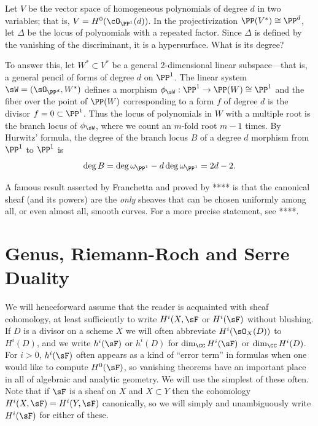 \begin{example}
 Let $V$ be the vector space of homogeneous polynomials of degree $d$ in two variables; that is, $V = H^0(\cO_{\PP^1}(d))$. In the projectivization $\PP(V^{*}) \cong \PP^d$, let $\Delta$ be the locus of polynomials with a repeated factor. Since $\Delta$ is defined by the vanishing of the discriminant, it is a hypersurface. What is its degree?
 
 To answer this, let $W^{*}\subset V^{*}$ be a general 2-dimensional linear subspace---that is, a general pencil of forms of degree $d$ on $\PP^1$. The linear system $\sW = (\sO_{\PP^{d}}, W^{*})$ defines a morphism $\phi_{\sW} : \PP^{1} \to \PP(W) \cong \PP^{1}$ and the fiber over the point of $\PP(W)$ corresponding to a form $f$ of degree $d$ is the divisor $f = 0\subset \PP^{1}$. Thus the locus of polynomials in $W$ with a multiple root is the branch locus of $\phi_{\sW}$, where we count an $m$-fold root $m-1$ times.
 By Hurwitz' formula, the degree of the branch locus $B$ of a degree $d$ morphism from $\PP^{1}$ to $\PP^{1}$ is
 $$
 \deg B = \deg \omega_{\PP^{1}} - d\deg \omega_{\PP^{1}} = 2d-2.
 $$
 \end{example}
 
\begin{fact}
A famous result asserted by Franchetta and proved by **** is that the canonical sheaf (and its powers) are the \emph{only} sheaves that can be chosen uniformly among all, or even almost all, smooth curves. For a more precise statement, see ****.
\end{fact}

\section{Genus, Riemann-Roch and Serre Duality}

We will henceforward assume that the reader is acquainted with sheaf cohomology, at least sufficiently to write
$H^i(X, \sF$ or  $H^i(\sF)$ without blushing. If $D$ is a divisor on a scheme $X$ we will often
abbreviate $H^i(\sO_X(D))$ to $H^i(D)$, and we write $h^i(\sF)$ or $h^{i}(D)$ for $\dim_{\CC}H^i(\sF)$ or $\dim_{\CC}H^i(D)$. For $i>0$, $h^{i}(\sF)$ often appears as a kind of ``error term'' in formulas when one would like to compute
$H^{0}(\sF)$, so vanishing theorems have an important place in all of algebraic and analytic geometry. We will use the simplest of these often.
Note that if $\sF$ is a sheaf on $X$ and $X\subset Y$ then the cohomology  $H^i(X, \sF) = H^i(Y,\sF)$ canonically, so we will
simply and unambiguously write $H^i(\sF)$ for either of these.

